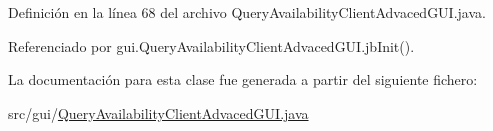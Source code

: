 Definición en la línea 68 del archivo Query\+Availability\+Client\+Advaced\+G\+U\+I.\+java.



Referenciado por gui.\+Query\+Availability\+Client\+Advaced\+G\+U\+I.\+jb\+Init().



La documentación para esta clase fue generada a partir del siguiente fichero\+:\begin{DoxyCompactItemize}
\item 
src/gui/\mbox{\hyperlink{_query_availability_client_advaced_g_u_i_8java}{Query\+Availability\+Client\+Advaced\+G\+U\+I.\+java}}\end{DoxyCompactItemize}
